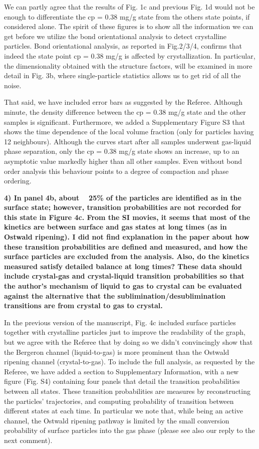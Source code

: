 \documentclass[11pt,a4paper]{article}
\newenvironment{referee}%
{\bigskip\singlespacing\bf}%
{\par\bigskip}
\begin{document}
We can partly agree that the results of Fig. 1c and previous Fig. 1d would not be enough to differentiate the  cp = 0.38 mg/g state from the others
state points, if considered alone. The spirit of these figures is to show all the information we can get before we utilize the bond orientational
analysis to detect crystalline particles. Bond orientational analysis, as reported in Fig.2/3/4, confirms
that indeed the state point cp = 0.38 mg/g is affected by crystallization. In particular, the dimensionality obtained
with the structure factors, will be examined in more detail in Fig. 3b, where single-particle statistics allows us to get rid of all the noise.

That said, we have included error bars as suggested by the Referee. Although minute, the density difference between the cp = 0.38 mg/g state and the other samples is significant. Furthermore, we added a Supplementary Figure S3 that shows the time dependence of the local volume fraction (only for particles having 12 neighbours). Although the curves start after all samples underwent gas-liquid phase separation, only the cp = 0.38 mg/g state shows an increase, up to an asymptotic value markedly higher than all other samples. Even without bond order analysis this behaviour points to a degree of compaction and phase ordering.


\begin{referee}
4) In panel 4b, about ~ 25\% of the particles are identified as in the surface state; however, transition probabilities are not recorded for this state in Figure 4c. From the SI movies, it seems that most of the kinetics are between surface and gas states at long times (as in Ostwald ripening). I did not find explanation in the paper about how these transition probabilities are defined and measured, and how the surface particles are excluded from the analysis. Also, do the kinetics measured satisfy detailed balance at long times? These data should include crystal-gas and crystal-liquid transition probabilities so that the author's mechanism of liquid to gas to crystal can be evaluated against the alternative that the sublimination/desublimination transitions are from crystal to gas to crystal.
\end{referee}

In the previous version of the manuscript, Fig. 4c included surface particles together with crystalline particles just to improve
the readability of the graph, but we agree with the Referee that by doing so we didn't convincingly show that the Bergeron channel (liquid-to-gas)
is more prominent than the Ostwald ripening channel (crystal-to-gas). 
To include the full analysis, as requested by the Referee,
we have added a section to Supplementary Information, with a new figure (Fig. S4) containing four panels that detail the transition 
probabilities between all states. These transition probabilities are measures by reconstructing the particles' trajectories, and
computing probability of transition between different states at each time.
In particular we note that, while being an active channel, the Ostwald ripening pathway is limited by
the small conversion probability of surface particles into the gas phase (please see also our reply to the next comment).
\end{document}
